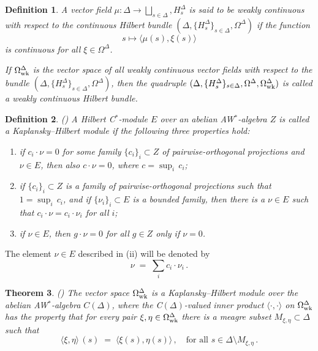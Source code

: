 \documentclass{amsart}
\newtheorem{theorem}{Theorem}[section]
\newtheorem{definition}[theorem]{Definition}
\theoremstyle{definition}
\theoremstyle{remark}
\begin{document}
\begin{definition}\label{definition:weakly continuous}  
A vector field $\mu:\Delta\rightarrow\bigsqcup_{s\in\Delta},H_s^\Delta$ is said to be \emph{weakly continuous} with
respect to the continuous Hilbert bundle $(\Delta,\{H_s^\Delta\}_{s\in\Delta},\Omega^\Delta)$ if the function
\[
s\mapsto \langle \mu(s),\xi(s)\rangle
\]
is continuous for all $\xi\in\Omega^\Delta$.

If $\Omega_{\rm wk}^\Delta$
is the vector space of all weakly continuous vector fields with respect
to the bundle $(\Delta,\{H_s^\Delta\}_{s\in\Delta},\Omega^\Delta)$, then the quadruple
$(\Delta,\{H_s^\Delta\}_{s\in\Delta},\Omega^\Delta, \Omega_{\rm wk}^\Delta)$ is
called a \emph{weakly continuous Hilbert bundle}.
\end{definition}

\begin{definition} {\rm (\cite{kaplansky1953})}
A Hilbert C$^*$-module $E$ over an abelian AW$^*$-algebra $Z$ is called
a {\em Kaplansky--Hilbert module} if the following three
properties hold:
\begin{enumerate}
  \item\label{definition:Kaplansky-Hilbert module:1} if $c_i\cdot \nu=0$ for some family $\{c_i\}_i\subset Z$ of pairwise-orthogonal
                projections and $\nu\in E$, then also $c\cdot\nu=0$,
               where $c=\sup_i\,c_i$;
  \item\label{definition:Kaplansky-Hilbert module:2} if
$\{c_i\}_i\subset Z$ is a family of pairwise-orthogonal
projections such that $1=\sup_i\,c_i$, and if $\{\nu_i\}_i\subset
E$ is a bounded family, then there is a $\nu\in E$
such that $c_i\cdot\nu=c_i\cdot\nu_i$ for all $i$;
  \item if $\nu\in E$, then $g\cdot\nu=0$ for all $g\in Z$ only if $\nu=0$.
\end{enumerate}
\end{definition}

The element $\nu\in E$
described in (ii) will be denoted by
\begin{equation}\label{aw sum}
\nu\;=\;\sum_ic_i\cdot\nu_i\,.
\end{equation}

\begin{theorem}\label{wchb} {\rm (\cite{argerami--farenick--massey2010})} The vector space
$\Omega_{\rm wk}^\Delta$ is a Kaplansky--Hilbert module over the abelian AW$^*$-algebra $C(\Delta)$, where the
C$(\Delta)$-valued inner product $\langle\cdot,\cdot\rangle$ on  $\Omega_{\rm wk}^\Delta$ has the property that for every pair $\xi,\eta\in\Omega_{\rm wk}^\Delta$
there is a meagre subset $M_{\xi,\eta}\subset\Delta$ such that
\[
\langle\xi,\eta\rangle\,(s)\;=\;\langle\xi(s),\eta(s)\rangle\,,\quad\mbox{for all }s\in\Delta\setminus M_{\xi,\eta}\,.
\]
\end{theorem}
\end{document}
